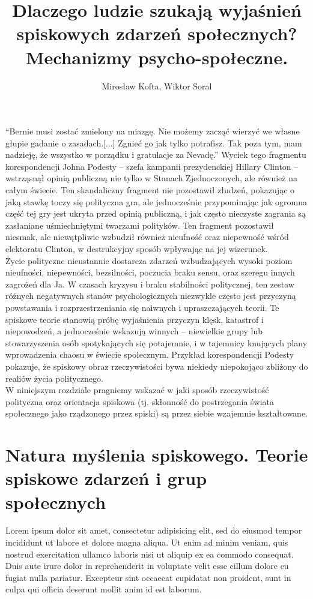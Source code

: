 \documentclass[man]{apa6}
\title{Dlaczego ludzie szukają wyjaśnień spiskowych zdarzeń społecznych? Mechanizmy psycho-społeczne.}
\author{Mirosław Kofta, Wiktor Soral}
\affiliation{Uniwersytet Warszawski}
\begin{document}
    \maketitle
    ``Bernie musi zostać zmielony na miazgę. Nie możemy zacząć wierzyć we własne głupie gadanie o zasadach.[...] Zgnieć go jak tylko potrafisz. Tak poza tym, mam nadzieję, że wszystko w porządku i gratulacje za Nevadę.'' Wyciek tego fragmentu korespondencji Johna Podesty -- szefa kampanii prezydenckiej Hillary Clinton -- wstrząsnął opinią publiczną nie tylko w Stanach Zjednoczonych, ale również na całym świecie. Ten skandaliczny fragment nie pozostawił złudzeń, pokazując o jaką stawkę toczy się polityczna gra, ale jednocześnie przypominając jak ogromna część tej gry jest ukryta przed opinią publiczną, i jak często nieczyste zagrania są zasłaniane uśmiechniętymi twarzami polityków. Ten fragment pozostawił niesmak, ale niewątpliwie wzbudził również nieufność oraz niepewność wśród elektoratu Clinton, w destrukcyjny sposób wpływając na jej wizerunek.\\

    Życie polityczne nieustannie dostarcza zdarzeń wzbudzających wysoki poziom nieufności, niepewności, bezsilności, poczucia braku sensu, oraz szeregu innych zagrożeń dla Ja. W czasach kryzysu i braku stabilności politycznej, ten zestaw różnych negatywnych stanów psychologicznych niezwykle często jest przyczyną powstawania i rozprzestrzeniania się naiwnych i upraszczających teorii. Te spiskowe teorie stanowią próbę wyjaśnienia przyczyn klęsk, katastrof i niepowodzeń, a jednocześnie wskazują winnych -- niewielkie grupy lub stowarzyszenia osób spotykających się potajemnie, i w tajemnicy knujących plany wprowadzenia chaosu w świecie społecznym. Przykład korespondencji Podesty pokazuje, że spiskowy obraz rzeczywistości bywa niekiedy niepokojąco zbliżony do realiów życia politycznego.\\

    W niniejszym rozdziale pragniemy wskazać w jaki sposób rzeczywistość polityczna oraz orientacja spiskowa (tj. skłonność do postrzegania świata społecznego jako rządzonego przez spiski) są przez siebie wzajemnie kształtowane.

    \section{Natura myślenia spiskowego. Teorie spiskowe zdarzeń i grup społecznych}

    Lorem ipsum dolor sit amet, consectetur adipisicing elit, sed do eiusmod tempor incididunt ut labore et dolore magna aliqua. Ut enim ad minim veniam, quis nostrud exercitation ullamco laboris nisi ut aliquip ex ea commodo consequat. Duis aute irure dolor in reprehenderit in voluptate velit esse cillum dolore eu fugiat nulla pariatur. Excepteur sint occaecat cupidatat non proident, sunt in culpa qui officia deserunt mollit anim id est laborum.
\end{document}
